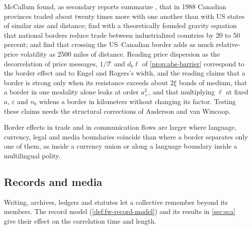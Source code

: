 \begin{remark}\label{rem:abs-borders}
McCallum found, as secondary reports summarize \citep{mccallum1995national}, that in 1988 Canadian provinces traded about twenty times more with one another than with US states of similar size and distance; \citet{anderson2003gravity} find with a theoretically founded gravity equation that national borders reduce trade between industrialized countries by 20 to 50 percent; and \citet{engel1996wide} find that crossing the US--Canadian border adds as much relative-price volatility as 2500 miles of distance. Reading price dispersion as the decorrelation of price messages, $1/\mathcal T$ and $d_b\ell$ of \cref{prop:abs-barrier} correspond to the border effect and to Engel and Rogers's width, and the reading claims that a border is strong only when its resistance exceeds about $2\xi$ bonds of medium, that a border in one modality alone leaks at order $a_\times^2$, and that multiplying $\ell$ at fixed $a$, $\varepsilon$ and $n_b$ widens a border in kilometers without changing its factor. Testing these claims needs the structural corrections of Anderson and van Wincoop.
\end{remark}

\begin{conjecture}\label{conj:abs-alignment}
Border effects in trade and in communication flows are larger where language, currency, legal and media boundaries coincide than where a border separates only one of them, as inside a currency union or along a language boundary inside a multilingual polity.
\end{conjecture}

\subsection{Records and media}\label{sec:abs-records}

Writing, archives, ledgers and statutes let a collective remember beyond its members. The record model (\cref{def:fw-record-model}) and its results in \cref{sec:sca} give their effect on the correlation time and length.

